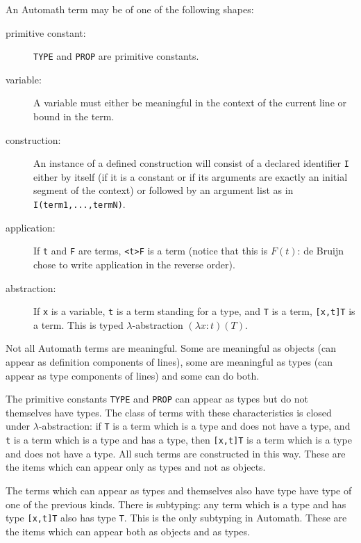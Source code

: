 \documentclass[12pt]{article}
\begin{document}
An Automath term may be of one of the following shapes:

\begin{description}

\item[primitive constant:]  {\tt TYPE} and {\tt PROP} are primitive constants.

\item[variable:]  A variable must either be meaningful in the context of the current line or bound in the term.  

\item[construction:]  An instance of a defined construction will consist of a declared identifier {\tt I}  either by itself (if it is a constant or if its arguments are exactly an initial segment of the context) or followed by an argument list as in
{\tt I(term1,...,termN)}.

\item[application:]  If {\tt t} and {\tt F} are terms, {\tt <t>F} is a term (notice that this is $F(t)$:  de Bruijn chose to write application in the reverse order).

\item[abstraction:]  If {\tt x} is a variable, {\tt t} is a term standing for a type, and {\tt T} is a term, {\tt [x,t]T} is a term.  This is typed $\lambda$-abstraction $(\lambda x:t)(T)$.

\end{description}

Not all Automath terms are meaningful.  Some are meaningful as objects (can appear as definition components of lines), some are meaningful as types (can appear as type components of lines) and some can do both.

The primitive constants {\tt TYPE} and {\tt PROP} can appear as types but do not themselves have types.  The class of terms with these characteristics is closed under $\lambda$-abstraction:
if {\tt T} is a term which is a type and does not have a type, and {\tt t} is a term which is a type and has a type, then {\tt [x,t]T} is a term which is a type and does not have a type.  All such terms are constructed in this way.  These are the items which can appear only as types and not as objects.

The terms which can appear as types and themselves also have type have type of one of the previous kinds.  There is subtyping:  any term which is a type and has type
{\tt [x,t]T} also has type {\tt T}.  This is the only subtyping in Automath.   These are the items which can appear both as objects and as types.
\end{document}
